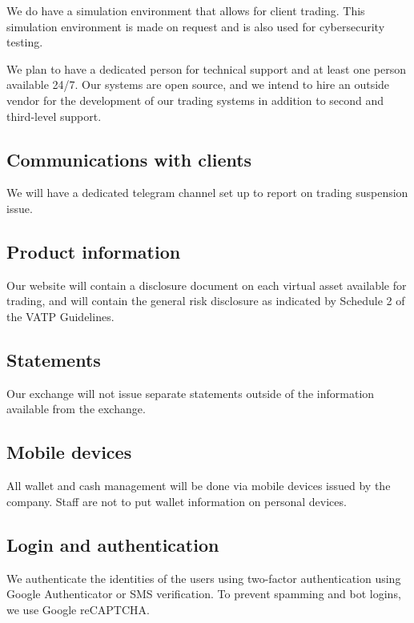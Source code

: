 We do have a simulation environment that allows for client
trading.  This simulation environment is made on request and is also
used for cybersecurity testing.

We plan to have a dedicated person for technical support and at least
one person available 24/7.  Our systems are open source, and we intend
to hire an outside vendor for the development of our trading systems in
addition to second and third-level support.

\subsection{Communications with clients}
We will have a dedicated telegram channel set up to report on trading
suspension issue.

\subsection{Product information}
Our website will contain a disclosure document on each virtual asset
available for trading, and will contain the general risk disclosure
as indicated by Schedule 2 of the VATP Guidelines.

\subsection{Statements}
Our exchange will not issue separate statements outside of the information available from the exchange.

\subsection{Mobile devices}
All wallet and cash management will be done via mobile devices issued
by the company.  Staff are not to put wallet information on personal
devices.

\subsection{Login and authentication}

We authenticate the identities of the users using two-factor
authentication using Google Authenticator or SMS verification.  To prevent spamming and bot logins, we use Google reCAPTCHA.

